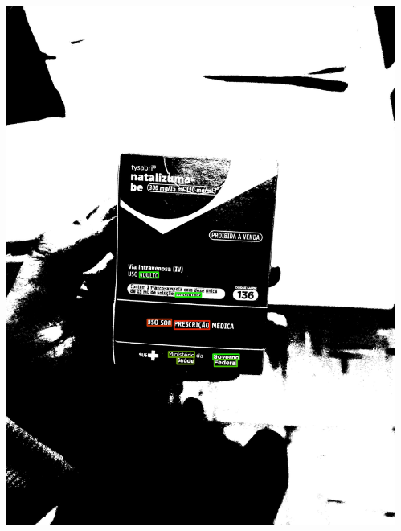 \begin{frame}
\begin{columns}
\begin{column}{0.24\textwidth}
			\includegraphics[height=0.35\textheight]{../pictures/tysabri_rgb_g_only_thresh_boxes.jpg}
		\end{column}
		\begin{column}{0.24\textwidth}\centering

\end{column}
\end{columns}
\end{frame}
